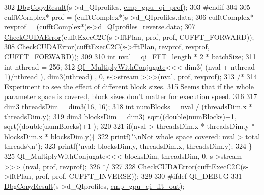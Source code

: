 \begin{DoxyCode}
302     \hyperlink{gpu__utils_8h_a90bb5228a452340dd6a505cfb4db25c7}{DbgCopyResult}(s->d\_QIprofiles, \hyperlink{test_8cu_a0f78dfbff0fc38f749d5a83cf7293b89}{cmp\_gpu\_qi\_prof});
303 \textcolor{preprocessor}{#endif}
304 
305     cufftComplex* prof = (cufftComplex*)s->d\_QIprofiles.data;
306     cufftComplex* revprof = (cufftComplex*)s->d\_QIprofiles\_reverse.data;
307     \hyperlink{gpu__utils_8h_ae6b059a7637782d61577e695c9d6303e}{CheckCUDAError}(cufftExecC2C(s->fftPlan, prof, prof, CUFFT\_FORWARD));
308     \hyperlink{gpu__utils_8h_ae6b059a7637782d61577e695c9d6303e}{CheckCUDAError}(cufftExecC2C(s->fftPlan, revprof, revprof, CUFFT\_FORWARD));
309 
310     \textcolor{keywordtype}{int} nval = \hyperlink{class_q_i_a9959b6d60486da504fca5c3c86fb2fdd}{qi\_FFT\_length} * 2 * \hyperlink{class_q_i_aa7bd10a94c9128943ff9f1775614f704}{batchSize};
311     \textcolor{keywordtype}{int} nthread = 256;
312     \hyperlink{group__kernels_gaf620f6888bd27603c02cbbcc6cb77cce}{QI\_MultiplyWithConjugate}<<< dim3( (nval + nthread - 1)/nthread ), dim3(nthread)
      , 0, s->stream >>>(nval, prof, revprof);
313     \textcolor{comment}{/* }
314 \textcolor{comment}{    Experiment to see the effect of different block sizes.}
315 \textcolor{comment}{    Seems that if the whole parameter space is covered, block sizes don't matter for execution speed.}
316 \textcolor{comment}{}
317 \textcolor{comment}{    dim3 threadsDim = dim3(16, 16);}
318 \textcolor{comment}{    int numBlocks = nval / (threadsDim.x * threadsDim.y);}
319 \textcolor{comment}{    dim3 blocksDim = dim3( sqrt((double)numBlocks)+1, sqrt((double)numBlocks)+1 );}
320 \textcolor{comment}{        }
321 \textcolor{comment}{    if(nval > threadsDim.x * threadsDim.y * blocksDim.x * blocksDim.y)\{}
322 \textcolor{comment}{        printf("\(\backslash\)nNot whole space covered: nval > total threads\(\backslash\)n");}
323 \textcolor{comment}{        printf("nval: %
       blocksDim.y, threadsDim.x, threadsDim.y);}
324 \textcolor{comment}{    \}}
325 \textcolor{comment}{    QI\_MultiplyWithConjugate<<< blocksDim, threadsDim, 0, s->stream >>> (nval, prof, revprof);}
326 \textcolor{comment}{    */}
327     
328     \hyperlink{gpu__utils_8h_ae6b059a7637782d61577e695c9d6303e}{CheckCUDAError}(cufftExecC2C(s->fftPlan, prof, prof, CUFFT\_INVERSE));
329 
330 \textcolor{preprocessor}{#ifdef QI\_DEBUG}
331     \hyperlink{gpu__utils_8h_a90bb5228a452340dd6a505cfb4db25c7}{DbgCopyResult}(s->d\_QIprofiles, \hyperlink{test_8cu_a968a1f45bfd391f01eaee72d1ba61237}{cmp\_gpu\_qi\_fft\_out});

\end{DoxyCode}
